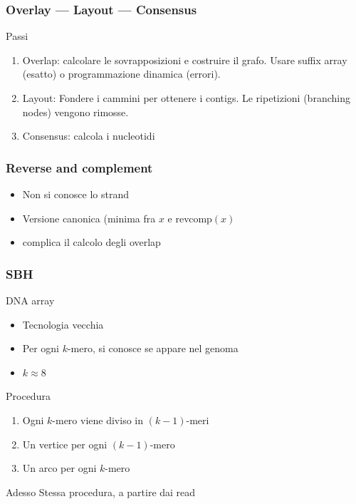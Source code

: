 \begin{frame}[fragile]
\frametitle{Overlay --- Layout --- Consensus}
\begin{block}{Passi}
\begin{enumerate}
\item
Overlap: calcolare le sovrapposizioni e costruire il grafo.
Usare suffix array (esatto) o programmazione dinamica (errori).
\item
Layout: Fondere i cammini per ottenere i  \alert{contigs}.
Le ripetizioni (branching nodes) vengono rimosse.
\item
Consensus: calcola i nucleotidi
\end{enumerate}
\end{block}
\end{frame}

\begin{frame}[fragile]
\frametitle{Reverse and complement}
\begin{itemize}
\item
Non si conosce lo strand
\item
Versione canonica (minima fra $x$ e revcomp$(x)$
\item
complica il calcolo degli overlap
\end{itemize}
\end{frame}

\begin{frame}[fragile]
\frametitle{SBH}
\begin{block}{DNA array}
\begin{itemize}
\item
Tecnologia vecchia
\item
Per ogni $k$-mero, si conosce se appare nel genoma
\item
$k\approx 8$
\end{itemize}
\end{block}

\begin{block}{Procedura}
\begin{enumerate}
\item
Ogni $k$-mero viene diviso in $(k-1)$-meri
\item
Un vertice per ogni $(k-1)$-mero
\item
Un arco per ogni $k$-mero
\end{enumerate}
\end{block}
\begin{block}{Adesso}
Stessa procedura, a partire dai read
\end{block}

\end{frame}



